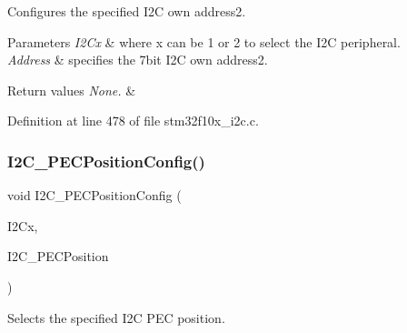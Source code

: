 Configures the specified I2C own address2. 


\begin{DoxyParams}{Parameters}
{\em I2\+Cx} & where x can be 1 or 2 to select the I2C peripheral. \\
\hline
{\em Address} & specifies the 7bit I2C own address2. \\
\hline
\end{DoxyParams}

\begin{DoxyRetVals}{Return values}
{\em None.} & \\
\hline
\end{DoxyRetVals}


Definition at line 478 of file stm32f10x\+\_\+i2c.\+c.

\mbox{\label{group___i2_c___private___functions_ga5d0f939bdd45542502827bf408f24161}} 
\subsubsection{\texorpdfstring{I2\+C\+\_\+\+P\+E\+C\+Position\+Config()}{I2C\_PECPositionConfig()}}
{\footnotesize\ttfamily void I2\+C\+\_\+\+P\+E\+C\+Position\+Config (\begin{DoxyParamCaption}\item[{\hyperlink{struct_i2_c___type_def}{I2\+C\+\_\+\+Type\+Def} $\ast$}]{I2\+Cx,  }\item[{uint16\+\_\+t}]{I2\+C\+\_\+\+P\+E\+C\+Position }\end{DoxyParamCaption})}



Selects the specified I2C P\+EC position. 


